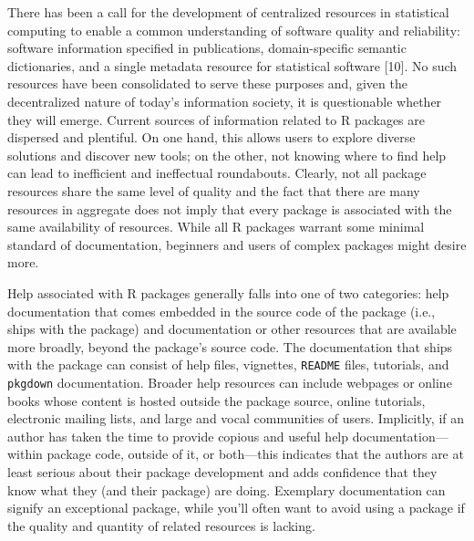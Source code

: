 \documentclass[10pt,letterpaper]{article}
\begin{document}
There has been a call for the development of centralized resources in
statistical computing to enable a common understanding of software
quality and reliability: software information specified in publications,
domain-specific semantic dictionaries, and a single metadata resource
for statistical software {[}10{]}. No such resources have been
consolidated to serve these purposes and, given the decentralized nature
of today's information society, it is questionable whether they will
emerge. Current sources of information related to R packages are
dispersed and plentiful. On one hand, this allows users to explore
diverse solutions and discover new tools; on the other, not knowing
where to find help can lead to inefficient and ineffectual roundabouts.
Clearly, not all package resources share the same level of quality and
the fact that there are many resources in aggregate does not imply that
every package is associated with the same availability of resources.
While all R packages warrant some minimal standard of documentation,
beginners and users of complex packages might desire more.

Help associated with R packages generally falls into one of two
categories: help documentation that comes embedded in the source code of
the package (i.e., ships with the package) and documentation or other
resources that are available more broadly, beyond the package's source
code. The documentation that ships with the package can consist of help
files, vignettes, \texttt{README} files, tutorials, and \texttt{pkgdown}
documentation. Broader help resources can include webpages or online
books whose content is hosted outside the package source, online
tutorials, electronic mailing lists, and large and vocal communities of
users. Implicitly, if an author has taken the time to provide copious
and useful help documentation---within package code, outside of it, or
both---this indicates that the authors are at least serious about their
package development and adds confidence that they know what they (and
their package) are doing. Exemplary documentation can signify an
exceptional package, while you'll often want to avoid using a package if
the quality and quantity of related resources is lacking.
\end{document}
